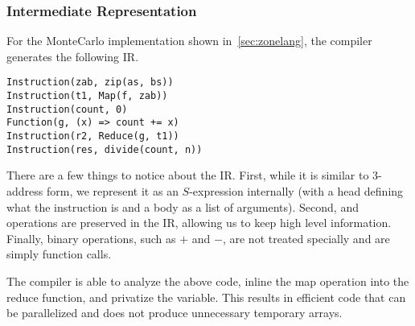 \subsubsection{Intermediate Representation}

For the MonteCarlo implementation shown in~\ref{sec:zonelang}, the 
	compiler generates the following IR.

\begin{verbatim}
Instruction(zab, zip(as, bs))
Instruction(t1, Map(f, zab))
Instruction(count, 0)
Function(g, (x) => count += x)
Instruction(r2, Reduce(g, t1))
Instruction(res, divide(count, n))
\end{verbatim}

There are a few things to notice about the IR.
First, while it is similar to $3$-address form,
	we represent it as an $S$-expression internally 
	(with a head defining what the instruction is and a body
	as a list of arguments).
Second,  and  operations are preserved in the IR, 
	allowing us to keep high level information.
Finally, binary operations, such as $+$ and $-$, are not
	treated specially and are simply function calls.

The compiler is able to analyze the above code, inline the map operation
into the reduce function, and privatize the  variable. This
results in efficient code that can be parallelized and does not produce
unnecessary temporary arrays.
